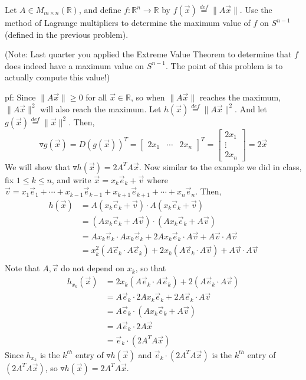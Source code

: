 \documentclass[11pt,letterpaper,cm]{nupset}
\newcommand{\bmat}[1]{\begin{bmatrix} #1 \end{bmatrix}}
\begin{document}
\newpage
\begin{problem}[Exercise 6] Let $A\in M_{m\times n}(\mathbb{R})$, and define $f:\mathbb{R}^n\to\mathbb{R}$ by $f(\vec{x})\stackrel{def}{=} \|A\vec{x}\|$.  Use the method of Lagrange multipliers to determine the maximum value of $f$ on $S^{n-1}$ (defined in the previous problem).
	\medskip
	
	(Note: Last quarter you applied the Extreme Value Theorem to determine that $f$ does indeed have a maximum value on $S^{n-1}$.  The point of this problem is to actually compute this value!)
\end{problem}
\begin{solution}
	pf: Since $\|A\vec{x}\|\geq 0$ for all $\vec{x}\in\mathbb{R}$, so when $\|A\vec{x}\|$ reaches the maximum, $\|A\vec{x}\|^2$ will also reach the maximum. Let $h(\vec{x})\stackrel{def}{=}\|A\vec{x}\|^2$. And let $g(\vec{x})\stackrel{def}{=}\|\vec{x}\|^2$. Then,
	$$\triangledown g(\vec{x})=D(g(\vec{x}))^T=\bmat{2x_1 & \cdots & 2x_n}^T=\bmat{2x_1\\\vdots\\2x_n}=2\vec{x}$$
	We will show that $\triangledown h(\vec{x})=2A^TA\vec{x}$. Now similar to the example we did in class, fix $1\leq k\leq n$, and write $\vec{x}=x_k\vec{e}_k+\vec{v}$ where $\vec{v}=x_1\vec{e}_1+\cdots+x_{k-1}\vec{e}_{k-1}+x_{k+1}\vec{e}_{k+1}+\cdots+x_n\vec{e}_n$. Then,
	\begin{align*}
		h(\vec{x})&=A(x_k\vec{e}_k+\vec{v})\cdot A(x_k\vec{e}_k+\vec{v})\\
		&=(Ax_k\vec{e}_k+A\vec{v})\cdot (Ax_k\vec{e}_k+A\vec{v})\\
		&=Ax_k\vec{e}_k\cdot Ax_k\vec{e}_k+2Ax_k\vec{e}_k\cdot A\vec{v}+A\vec{v}\cdot A\vec{v}\\
		&=x_k^2(A\vec{e}_k\cdot A\vec{e}_k)+2x_k(A\vec{e}_k\cdot A\vec{v})+A\vec{v}\cdot A\vec{v}\\
	\end{align*}
	Note that $A,\vec{v}$ do not depend on $x_k$, so that
	\begin{align*}
		h_{x_k}(\vec{x})&=2x_k(A\vec{e}_k\cdot A\vec{e}_k)+2(A\vec{e}_k\cdot A\vec{v})\\
		&=A\vec{e}_k\cdot 2Ax_k\vec{e}_k+2A\vec{e}_k\cdot A\vec{v}\\
		&=A\vec{e}_k\cdot(Ax_k\vec{e}_k+A\vec{v})\\
		&=A\vec{e}_k\cdot 2A\vec{x}\\
		&=\vec{e}_k\cdot (2A^TA\vec{x})
	\end{align*}
	Since $h_{x_k}$ is the $k^{th}$ entry of $\triangledown h(\vec{x})$ and $\vec{e}_k\cdot (2A^TA\vec{x})$ is the $k^{th}$ entry of $(2A^TA\vec{x})$, so $\triangledown h(\vec{x})=2A^TA\vec{x}$.

\end{solution}
\end{document}
